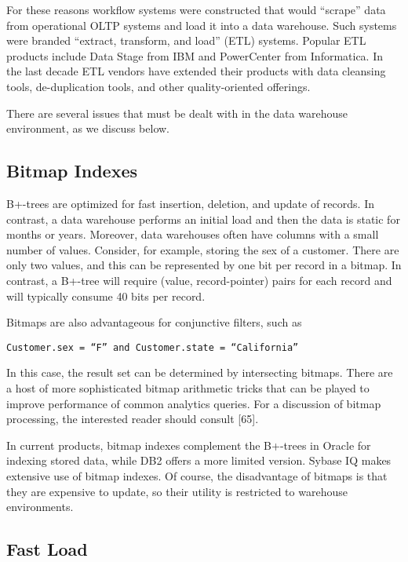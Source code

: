 \documentclass[a4paper,11pt,twoside,openright]{book}
\begin{document}
For these reasons workflow systems were constructed that would
``scrape'' data from operational OLTP systems and load it into a data
warehouse. Such systems were branded ``extract, transform, and load''
(ETL) systems. Popular ETL products include Data Stage from IBM and
PowerCenter from Informatica. In the last decade ETL vendors have
extended their products with data cleansing tools, de-duplication tools,
and other quality-oriented offerings.

There are several issues that must be dealt with in the data warehouse
environment, as we discuss below.

\hypertarget{bitmap-indexes}{%
\subsection{Bitmap Indexes}\label{bitmap-indexes}}

B+-trees are optimized for fast insertion, deletion, and update of
records. In contrast, a data warehouse performs an initial load and then
the data is static for months or years. Moreover, data warehouses often
have columns with a small number of values. Consider, for example,
storing the sex of a customer. There are only two values, and this can
be represented by one bit per record in a bitmap. In contrast, a B+-tree
will require (value, record-pointer) pairs for each record and will
typically consume 40 bits per record.

Bitmaps are also advantageous for conjunctive filters, such as\\

\centerline{\texttt{Customer.sex = ``F'' and Customer.state = ``California''}}

In this case, the result set can be determined by intersecting bitmaps.
There are a host of more sophisticated bitmap arithmetic tricks that can
be played to improve performance of common analytics queries. For a
discussion of bitmap processing, the interested reader should consult
{[}65{]}.

In current products, bitmap indexes complement the B+-trees in Oracle
for indexing stored data, while DB2 offers a more limited version.
Sybase IQ makes extensive use of bitmap indexes. Of course, the
disadvantage of bitmaps is that they are expensive to update, so their
utility is restricted to warehouse environments.

\hypertarget{fast-load}{%
\subsection{Fast Load}\label{fast-load}}
\end{document}
